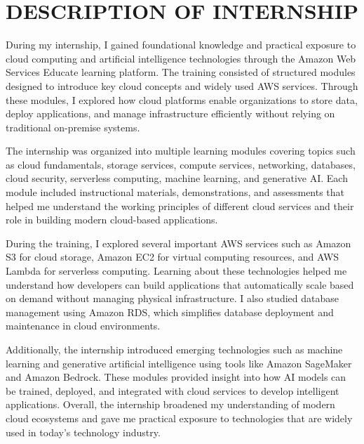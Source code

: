 \documentclass[12pt, a4paper, oneside]{report}
\begin{document}
\chapter{DESCRIPTION OF INTERNSHIP}

During my internship, I gained foundational knowledge and practical exposure to cloud 
computing and artificial intelligence technologies through the Amazon Web Services 
Educate learning platform. The training consisted of structured modules designed to 
introduce key cloud concepts and widely used AWS services. Through these modules, I 
explored how cloud platforms enable organizations to store data, deploy applications, 
and manage infrastructure efficiently without relying on traditional on-premise systems.

The internship was organized into multiple learning modules covering topics such as 
cloud fundamentals, storage services, compute services, networking, databases, cloud 
security, serverless computing, machine learning, and generative AI. Each module 
included instructional materials, demonstrations, and assessments that helped me 
understand the working principles of different cloud services and their role in building 
modern cloud-based applications.

During the training, I explored several important AWS services such as Amazon S3 for 
cloud storage, Amazon EC2 for virtual computing resources, and AWS Lambda for 
serverless computing. Learning about these technologies helped me understand how 
developers can build applications that automatically scale based on demand without 
managing physical infrastructure. I also studied database management using Amazon 
RDS, which simplifies database deployment and maintenance in cloud environments.

Additionally, the internship introduced emerging technologies such as machine 
learning and generative artificial intelligence using tools like Amazon SageMaker 
and Amazon Bedrock. These modules provided insight into how AI models can be 
trained, deployed, and integrated with cloud services to develop intelligent applications. 
Overall, the internship broadened my understanding of modern cloud ecosystems and 
gave me practical exposure to technologies that are widely used in today's technology 
industry.


\end{document}
